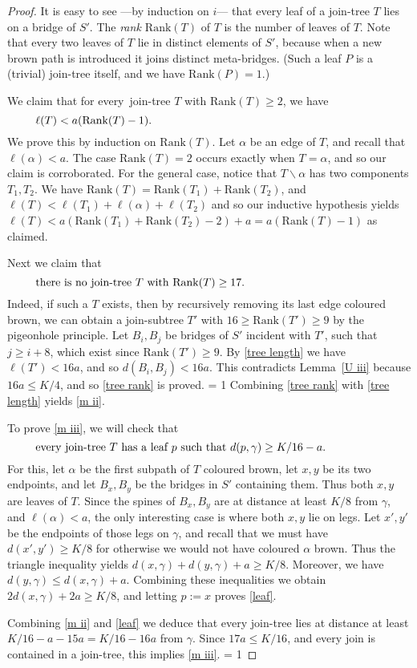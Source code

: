 \documentclass[a4paper]{article}
\newcommand{\Debug}{0}
\newcommand{\defi}[1]{{\color{darkgray}\emph{#1}}}
\newcommand{\sm}{\backslash}
\newcommand{\Lr}[1]{Lemma~\ref{#1}}
\newcommand{\fe}{for every}
\newcommand{\st}{such that}
\newcommand{\labtequ}[2]{\begin{equation} \label{#1} 	\begin{minipage}[c]{0.9\textwidth}  #2 \end{minipage} \ignorespacesafterend \end{equation} }
\newcommand{\mymargin}[1]{\ifnum \Debug = 1
  \marginpar{\begin{minipage}{\marginparwidth}\small \begin{flushleft}{\color{blue}#1}\end{flushleft}\end{minipage}}\fi
}
\newcommand{\rank}{\mathrm{Rank}}
\newcommand{\mb}{meta-bridge}
\begin{document}
\begin{proof}
It is easy to see ---by induction on $i$--- that every leaf  of a join-tree $T$ lies on a bridge of $S'$. The \defi{rank $\rank(T)$} of $T$ is the number of leaves of $T$. Note that every two leaves of $T$ lie in distinct elements of $S'$, because when a new brown path is introduced it joins distinct \mb s. (Such a leaf $P$ is a (trivial) join-tree itself, and we have $\rank(P)=1$.)
 
We claim that  \fe\ join-tree $T$ with $\rank(T)\geq 2$, we have
\labtequ{tree length}{$\ell(T)< a (\rank(T)-1)$.} 
We prove this by induction on $\rank(T)$. Let $\alpha$ be an edge of $T$, and recall that $\ell(\alpha)< a$. The case $\rank(T)=2$ occurs exactly when $T=\alpha$, and so our claim is corroborated. For the general case, notice that $T \sm \alpha$ has two components $T_1,T_2$. We have $\rank(T)= \rank(T_1)+  \rank(T_2)$, and $\ell(T)< \ell(T_1) + \ell(\alpha) + \ell(T_2)$ and so our inductive hypothesis yields  $\ell(T)< a (\rank(T_1)+  \rank(T_2)-2)+a = a (\rank(T)-1)$ as claimed.

Next we claim that 
\labtequ{tree rank}{there is no join-tree $T$ with $\rank(T)\geq 17$.}
Indeed, if such a $T$ exists, then by recursively removing its last edge coloured brown, we can obtain a join-subtree $T'$ with $16\geq \rank(T')\geq 9$ by the pigeonhole principle. Let $B_i,B_j$ be bridges of $S'$ incident with $T'$, \st\ $j\geq i+8$, which exist since $\rank(T')\geq 9$. By \eqref{tree length} we have $\ell(T')< 16a$, and so $d(B_i,B_j)< 16a$. This contradicts \Lr{U iii} because $16a\leq K/4$, and so \eqref{tree rank} is proved. \mymargin{need $a\leq K/32$} Combining \eqref{tree rank} with \eqref{tree length} yields \ref{m ii}.

\medskip
To prove \ref{m iii}, we will check that 
\labtequ{leaf}{every join-tree $T$ has a leaf $p$ \st\ $d(p,\gamma)\geq K/16-a$.}
For this, let $\alpha$ be the first subpath of $T$ coloured brown, let $x,y$ be its two endpoints, and let $B_x,B_y$ be the bridges in $S'$ containing them. Thus both $x,y$ are leaves of $T$. Since the spines of $B_x,B_y$ are at distance at least $K/8$ from $\gamma$, and $\ell(\alpha)<a$, the only interesting case is where both $x,y$ lie on legs. Let $x',y'$ be the endpoints of those legs on $\gamma$, and recall that we must have $d(x',y')\geq K/8$ for otherwise we would not have coloured $\alpha$ brown. Thus the triangle inequality yields $d(x,\gamma) + d(y,\gamma) + a \geq K/8$. Moreover, we have $d(y,\gamma) \leq d(x,\gamma) + a$. Combining these inequalities we obtain $2d(x,\gamma) + 2a \geq K/8$, and letting $p:=x$ proves \eqref{leaf}.

Combining  \ref{m ii} and \eqref{leaf} we deduce that every join-tree lies at distance at least  $K/16-a-15a=K/16-16a$ from $\gamma$. Since $17a\leq K/16$, and every join is contained in a join-tree, this implies \ref{m iii}. \mymargin{need $a\leq K/16\cdot 17$}
\end{proof}
\end{document}
